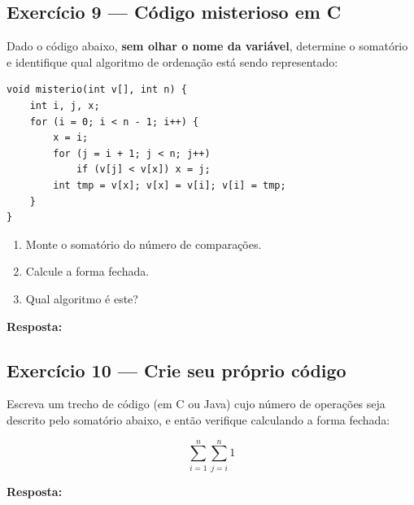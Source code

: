 \documentclass[12pt, a4paper]{article}
\newenvironment{resposta}{%
    \begin{mdframed}[linecolor=black!30, backgroundcolor=white,
                     innertopmargin=10pt, innerbottommargin=30pt,
                     skipabove=6pt]
    \textbf{Resposta:}\\[4pt]
}{%
    \end{mdframed}
}
\begin{document}
\subsection*{Exercício 9 — Código misterioso em C}

Dado o código abaixo, \textbf{sem olhar o nome da variável}, determine o somatório e identifique qual algoritmo de ordenação está sendo representado:

\begin{lstlisting}[style=cstyle]
void misterio(int v[], int n) {
    int i, j, x;
    for (i = 0; i < n - 1; i++) {
        x = i;
        for (j = i + 1; j < n; j++)
            if (v[j] < v[x]) x = j;
        int tmp = v[x]; v[x] = v[i]; v[i] = tmp;
    }
}
\end{lstlisting}

\begin{enumerate}[label=(\alph*)]
    \item Monte o somatório do número de comparações.
    \item Calcule a forma fechada.
    \item Qual algoritmo é este?
\end{enumerate}

\begin{resposta}
\vspace{3.5cm}
\end{resposta}

\subsection*{Exercício 10 — Crie seu próprio código}

Escreva um trecho de código (em C ou Java) cujo número de operações seja descrito pelo somatório abaixo, e então verifique calculando a forma fechada:

\[
\sum_{i=1}^{n} \sum_{j=i}^{n} 1
\]

\begin{resposta}
\vspace{4cm}
\end{resposta}
\end{document}
